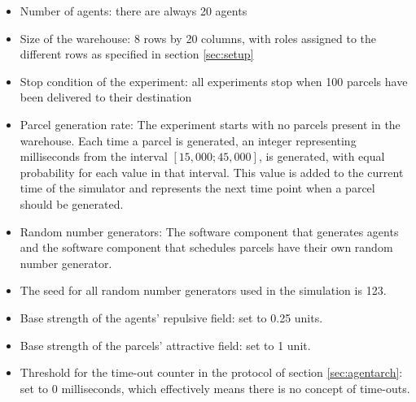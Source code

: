 \begin{itemize}
    \item Number of agents: there are always 20 agents
    \item Size of the warehouse: 8 rows by 20 columns, with roles assigned to the different rows as specified in section \ref{sec:setup}
    \item Stop condition of the experiment: all experiments stop when 100 parcels have been delivered to their destination
    \item Parcel generation rate: The experiment starts with no parcels present in the warehouse. Each time a parcel is generated, an integer representing milliseconds from the interval $[15,000 ; 45,000]$, is generated, with equal probability for each value in that interval. This value is added to the current time of the simulator and represents the next time point when a parcel should be generated.
    \item Random number generators: The software component that generates agents and the software component that schedules parcels have their own random number generator.
    \item The seed for all random number generators used in the simulation is 123.
    \item Base strength of the agents' repulsive field: set to 0.25 units.
    \item Base strength of the parcels' attractive field: set to 1 unit.
    \item Threshold for the time-out counter in the protocol of section \ref{sec:agentarch}: set to 0 milliseconds, which effectively means there is no concept of time-outs.
\end{itemize}

